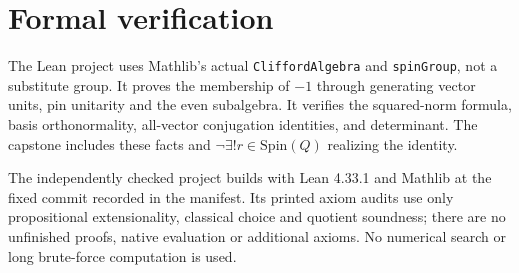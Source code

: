 \documentclass[11pt]{article}
\begin{document}
\section*{Formal verification}
The Lean project uses Mathlib's actual \texttt{CliffordAlgebra} and
\texttt{spinGroup}, not a substitute group. It proves the membership of
$-1$ through generating vector units, pin unitarity and the even subalgebra.
It verifies the squared-norm formula, basis orthonormality, all-vector
conjugation identities, and determinant. The capstone includes these
facts and $\neg\exists!r\in\mathrm{Spin}(Q)$ realizing the identity.

The independently checked project builds with Lean 4.33.1 and Mathlib at
the fixed commit recorded in the manifest. Its printed axiom audits use
only propositional extensionality, classical choice and quotient soundness;
there are no unfinished proofs, native evaluation or additional axioms.
No numerical search or long brute-force computation is used.
\end{document}

